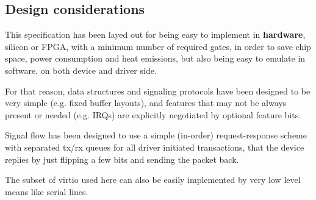 \subsection{Design considerations}\label{sec:Device Types / General Purpose IO / Design considerations}

This specification has been layed out for being easy to implement in \textbf{hardware},
silicon or FPGA, with a minimum number of required gates, in order to save chip space,
power consumption and heat emissions, but also being easy to emulate in software, on both
device and driver side.

For that reason, data structures and signaling protocols have been designed to be very
simple (e.g. fixed buffer layouts), and features that may not be always present or needed
(e.g. IRQs) are explicitly negotiated by optional feature bits.

Signal flow has been designed to use a simple (in-order) request-response scheme with
separated tx/rx queues for all driver initiated transactions, that the device replies
by just flipping a few bits and sending the packet back.

The subset of virtio used here can also be easily implemented by very low level means
like serial lines.
